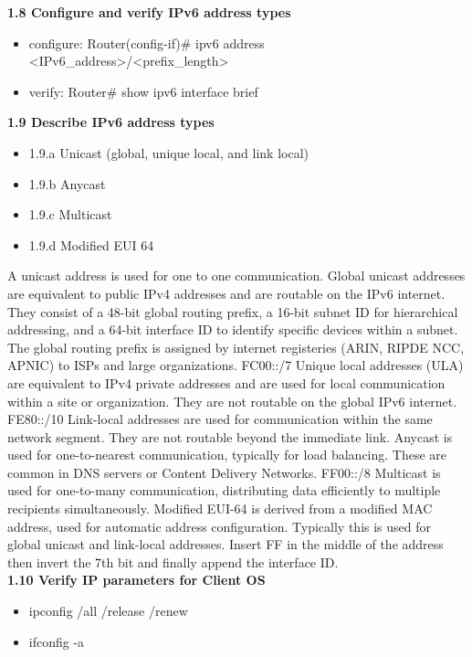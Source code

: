 \documentclass{article}
\begin{document}
\textbf{1.8 Configure and verify IPv6 address types}
\begin{itemize}
\item configure: Router(config-if)\# ipv6 address \textless IPv6\_address\textgreater/\textless prefix\_length\textgreater
\item verify: Router\# show ipv6 interface brief
 \end{itemize}
  
\textbf{1.9 Describe IPv6 address types}
\begin{itemize}
\item 1.9.a Unicast (global, unique local, and link local)
\item 1.9.b Anycast
\item 1.9.c Multicast
\item 1.9.d Modified EUI 64
\end{itemize}

	A unicast address is used for one to one communication. Global unicast addresses are equivalent to public IPv4 addresses and are routable on the IPv6 internet. They consist of a 48-bit global routing prefix, a 16-bit subnet ID for hierarchical addressing, and a 64-bit interface ID to identify specific devices within a subnet. The global routing prefix is assigned by internet registeries (ARIN, RIPDE NCC, APNIC) to ISPs and large organizations. FC00::/7 Unique local addresses (ULA) are equivalent to IPv4 private addresses and are used for local communication within a site or organization. They are not routable on the global IPv6 internet. FE80::/10 Link-local addresses are used for communication within the same network segment. They are not routable beyond the immediate link. Anycast is used for one-to-nearest communication, typically for load balancing. These are common in DNS servers or Content Delivery Networks. FF00::/8 Multicast is used for one-to-many communication, distributing data efficiently to multiple recipients simultaneously. Modified EUI-64 is derived from a modified MAC address, used for automatic address configuration. Typically this is used for global unicast and link-local addresses. Insert FF in the middle of the address then invert the 7th bit and finally append the interface ID.\\
  
\textbf{1.10 Verify IP parameters for Client OS}
\begin{itemize}
\item ipconfig /all /release /renew
\item ifconfig -a
\end{itemize}
 
\end{document}
